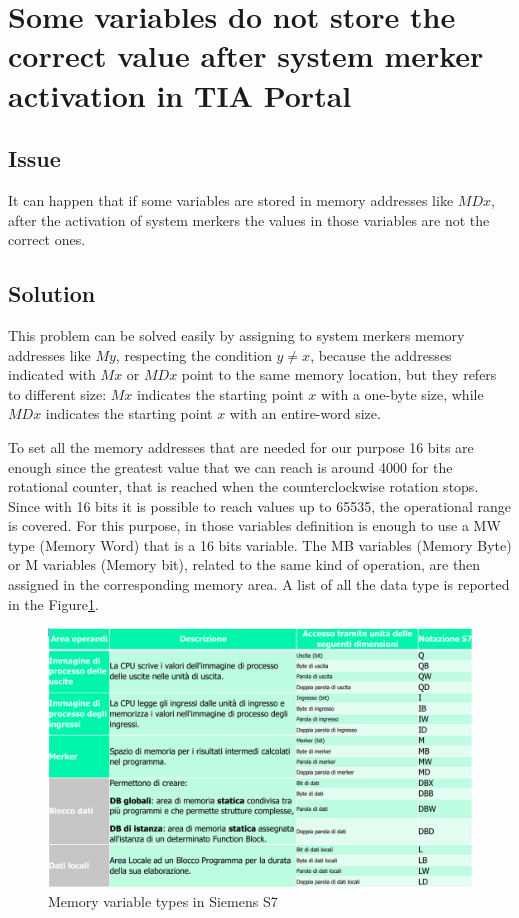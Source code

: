 \section{Some variables do not store the correct value after system merker activation in TIA Portal}
\subsection{Issue}
It can happen that if some variables are stored in memory addresses like $MDx$, after the activation of system merkers the values in those variables are not the correct ones.

\subsection{Solution}
This problem can be solved easily by assigning to system merkers memory addresses like $My$, respecting the condition $y\neq x$, because the addresses indicated with $Mx$ or $MDx$ point to the same memory location, but they refers to different size: $Mx$ indicates the starting point $x$ with a one-byte size, while $MDx$ indicates the starting point $x$ with an entire-word size.

To set all the memory addresses that are needed for our purpose 16 bits are enough since the greatest value that we can reach is around 4000 for the rotational counter, that is reached when the counterclockwise rotation stops. Since with 16 bits it is possible to reach values up to 65535, the operational range is covered. For this purpose, in those variables definition is enough to use a MW type (Memory Word) that is a 16 bits variable. The MB variables (Memory Byte) or M variables (Memory bit), related to the same kind of operation, are then assigned in the corresponding memory area. A list of all the data type is reported in the Figure\ref{fig:memory_variable_type}.

\begin{figure}[!h]
\begin{center}
\includegraphics[width=\linewidth]{capitolo4/figure/memory_type_PLC.png}
\caption{Memory variable types in Siemens S7}
\label{fig:memory_variable_type}
\end{center}
\end{figure}

